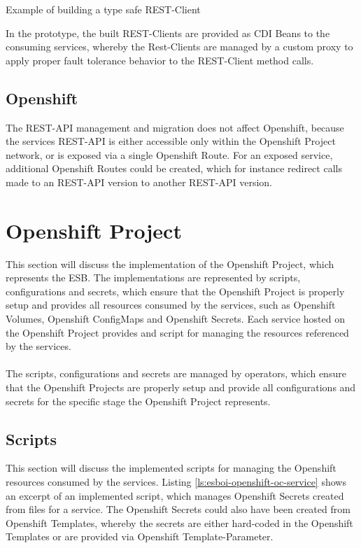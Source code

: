\begin{listing}[h]
	\caption{Example of building a type safe REST-Client}
	\label{ls:esboi-api-client-api-builder-java}
\end{listing}

In the prototype, the built REST-Clients are provided as CDI Beans to the consuming services, whereby the Rest-Clients are managed by a custom proxy to apply proper fault tolerance behavior to the REST-Client method calls.

\subsection{Openshift}
\label{sec:esbi-api-openshift}
The REST-API management and migration does not affect Openshift, because the services REST-API is either accessible only within the Openshift Project network, or is exposed via a single Openshift Route. For an exposed service, additional Openshift Routes could be created, which for instance redirect calls made to an REST-API version to another REST-API version. 

\section{Openshift Project}
\label{sec:esbi-openshift}
This section will discuss the implementation of the Openshift Project, which represents the ESB. The implementations are represented by scripts, configurations and secrets, which ensure that the Openshift Project is properly setup and provides all resources consumed by the services, such as Openshift Volumes, Openshift ConfigMaps and Openshift Secrets. Each service hosted on the Openshift Project provides and script for managing the resources referenced by the services. 
\\ \\
The scripts, configurations and secrets are managed by operators, which ensure that the Openshift Projects are properly setup and provide all configurations and secrets for the specific stage the Openshift Project represents.

\subsection{Scripts}
\label{sec:esbi-openshift-secrets}
This section will discuss the implemented scripts for managing the Openshift resources consumed by the services. Listing \vref{ls:esboi-openshift-oc-service} shows an excerpt of an implemented script, which manages Openshift Secrets created from files for a service. The Openshift Secrets could also have been created from Openshift Templates, whereby the secrets are either hard-coded in the Openshift Templates or are provided via Openshift Template-Parameter.

